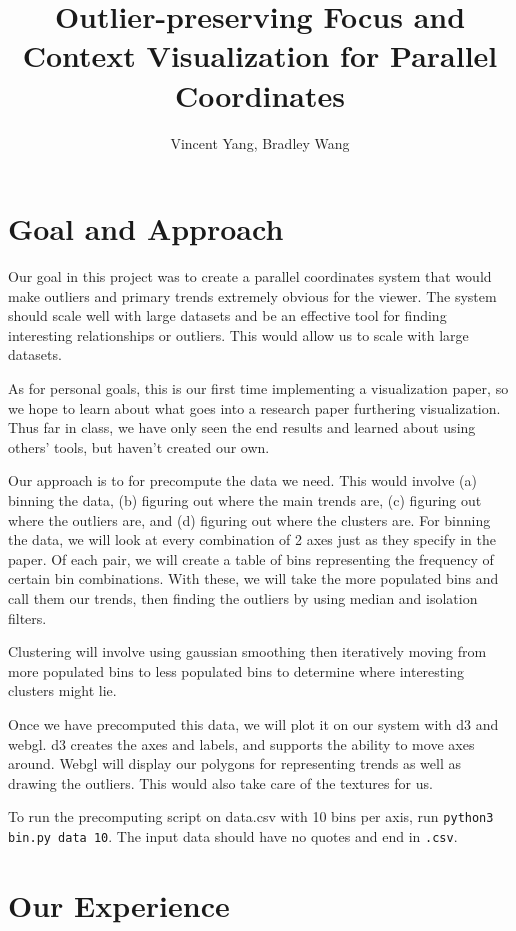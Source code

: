 \documentclass[	DIV=calc,%
			paper=a4,%
			fontsize=11pt,%
			twocolumn]{scrartcl}					%
\title{Outlier-preserving Focus and Context Visualization for Parallel Coordinates}		%
\author{Vincent Yang, Bradley Wang }			%
\date{}										%
\begin{document}
\maketitle
\thispagestyle{fancy} 								%


\section {Goal and Approach}
Our goal in this project was to create a parallel coordinates system that would make outliers and primary trends extremely obvious for the viewer. The system should scale well with large datasets and be an effective tool for finding interesting relationships or outliers. This would allow us
to scale with large datasets.

As for personal goals, this is our first time implementing a visualization paper, so we
hope to learn about what goes into a research paper furthering visualization. 
Thus far in class, we have only seen the end results and learned about using others' tools,
but haven't created our own. 

Our approach is to for precompute the data we need. This would involve (a) binning the data, (b) figuring out 
where the main trends are, (c) figuring out where the outliers are, and (d) figuring out where the clusters are. 
For binning the data, we will look at every combination of 2 axes just as they specify in the paper. Of each pair,
we will create a table of bins representing the frequency of certain bin combinations. With these, we will take the
more populated bins and call them our trends, then finding the outliers by using median and isolation filters.

Clustering will involve using gaussian smoothing then iteratively moving from more populated bins
to less populated bins to determine where interesting clusters might lie. 

Once we have precomputed this data, we will plot it on our system with d3 and webgl. d3 creates
the axes and labels, and supports the ability to move axes around. Webgl will display our polygons for
representing trends as well as drawing the outliers. This would also take care of the textures for us. 

To run the precomputing script on data.csv with 10 bins per axis, run \texttt{python3 bin.py data 10}. The input
data should have no quotes and end in \texttt{.csv}.


\section {Our Experience}
\end{document}
